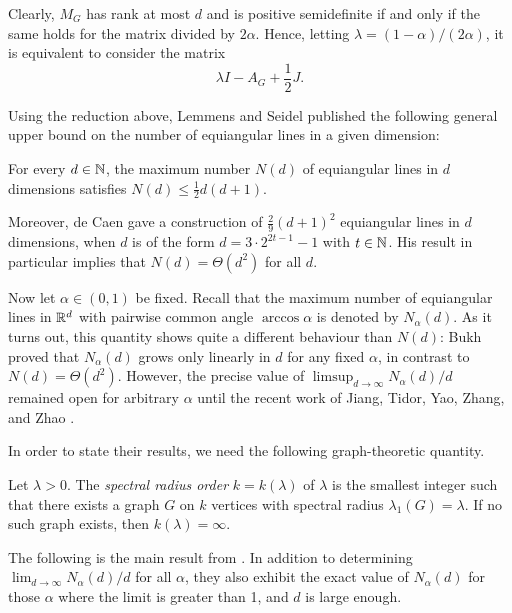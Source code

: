 \begin{remark}
    Clearly, $M_G$ has rank at most $d$ and is positive semidefinite if and only if the same holds for the matrix divided by $2\alpha$.
    Hence, letting $\lambda = (1 - \alpha)/(2 \alpha)$, it is equivalent to consider the matrix
    \begin{equation*}
        \lambda I - A_G + \frac{1}{2} J.
    \end{equation*}
\end{remark}

Using the reduction above, Lemmens and Seidel \cite{lemmensseidel} published the following general upper bound on the number of equiangular lines in a given dimension:
\begin{theorem}
    For every $d \in \mathbb{N}$, the maximum number $N(d)$ of equiangular lines in $d$ dimensions satisfies $N(d) \le \frac{1}{2} d (d + 1)$.
\end{theorem}
Moreover, de Caen \cite{decaen} gave a construction of $\frac{2}{9} (d + 1)^2$ equiangular lines in $d$ dimensions, when $d$ is of the form $d = 3 \cdot 2^{2 t - 1} - 1$ with $t \in \mathbb{N}$.
His result in particular implies that $N(d) = \Theta (d^2)$ for all $d$.

Now let $\alpha \in (0, 1)$ be fixed. 
Recall that the maximum number of equiangular lines in $\mathbb{R}^d$ with pairwise common angle $\arccos \alpha$ is denoted by $N_\alpha (d)$.
As it turns out, this quantity shows quite a different behaviour than $N(d)$: 
Bukh \cite{bukh} proved that $N_\alpha(d)$ grows only linearly in $d$ for any fixed $\alpha$, in contrast to $N(d) = \Theta(d^2)$.
However, the precise value of $\limsup_{d \rightarrow \infty} N_\alpha (d) / d$ remained open for arbitrary $\alpha$ until the recent work of Jiang, Tidor, Yao, Zhang, and Zhao \cite{equiangular}.

In order to state their results, we need the following graph-theoretic quantity.
\begin{definition}
    Let $\lambda > 0$. 
    The \textit{spectral radius order} $k = k(\lambda)$ of $\lambda$ is the smallest integer such that there exists a graph $G$  on $k$ vertices with spectral radius $\lambda_1(G) = \lambda$. 
    If no such graph exists, then $k(\lambda) = \infty$.
\end{definition}

The following is the main result from \cite{equiangular}.
In addition to determining \sloppy $\lim_{d \rightarrow \infty} N_\alpha(d) / d$ for all $\alpha$, they also exhibit the exact value of $N_\alpha(d)$ for those $\alpha$ where the limit is greater than 1, and $d$ is large enough.

